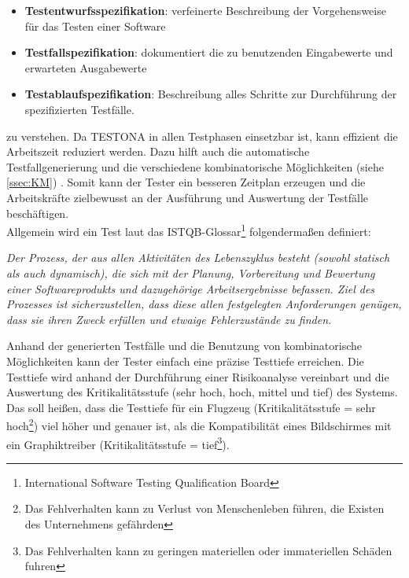 \begin{itemize}
\item\textbf{ Testentwurfsspezifikation}: verfeinerte Beschreibung der Vorgehensweise für das Testen einer Software
\item \textbf{Testfallspezifikation}: dokumentiert die zu benutzenden Eingabewerte und erwarteten Ausgabewerte
\item \textbf{Testablaufspezifikation}: Beschreibung alles Schritte zur Durchführung der spezifizierten Testfälle.
\end{itemize}

zu verstehen. Da TESTONA in allen Testphasen einsetzbar ist, kann effizient die Arbeitszeit reduziert werden. Dazu hilft auch die automatische Testfallgenerierung und die verschiedene kombinatorische Möglichkeiten (siehe \ref{ssec:KM}) . Somit kann der Tester ein besseren Zeitplan erzeugen und die Arbeitskräfte zielbewusst an der Ausführung und Auswertung der Testfälle beschäftigen.\\

Allgemein wird ein Test laut das ISTQB-Glossar\footnote{International Software Testing Qualification Board} folgendermaßen definiert:

\begin{center}
\textit{
Der Prozess, der aus allen Aktivitäten des Lebenszyklus besteht (sowohl statisch als auch dynamisch), die sich mit der Planung, Vorbereitung und Bewertung einer Softwareprodukts und dazugehörige Arbeitsergebnisse befassen. Ziel des Prozesses ist sicherzustellen, dass diese allen festgelegten Anforderungen genügen, dass sie ihren Zweck erfüllen und etwaige Fehlerzustände zu finden.}\cite{SoftwareTestEmbSys}\\

\end{center}

Anhand der generierten Testfälle und die Benutzung von  kombinatorische Möglichkeiten kann der Tester einfach eine präzise Testtiefe erreichen. Die Testtiefe wird anhand der Durchführung einer Risikoanalyse vereinbart und die Auswertung des Kritikalitätsstufe (sehr hoch, hoch, mittel und tief) des Systems. Das soll heißen, dass die Testtiefe für ein Flugzeug (Kritikalitätsstufe = sehr hoch\footnote{Das Fehlverhalten kann zu Verlust von Menschenleben führen, die Existen des Unternehmens gefährden}) viel höher und genauer ist, als die Kompatibilität eines Bildschirmes mit ein Graphiktreiber (Kritikalitätsstufe = tief\footnote{Das Fehlverhalten kann zu geringen materiellen oder immateriellen Schäden fuhren}).\\


